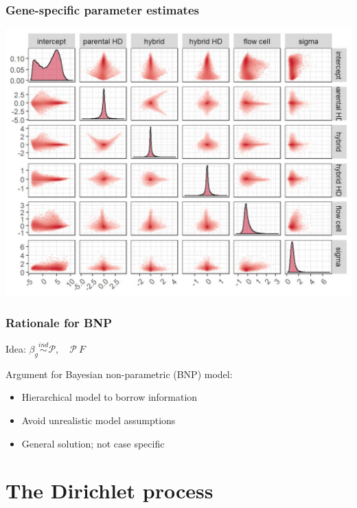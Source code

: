 \documentclass{beamer}
\newcommand{\ind}{\stackrel{ind}{\sim}}
\begin{document}
\begin{frame}%
  \frametitle{Gene-specific parameter estimates}
  {\centering
    \includegraphics[width=.8\textwidth]{pairs1}\\
  }
\end{frame}
  
\begin{frame}%
  \frametitle{Rationale for BNP}
  Idea: $\beta_g \ind \mathcal{P},\quad \mathcal{P} ~ F$
  
  Argument for Bayesian non-parametric (BNP) model:
  \begin{itemize}
    \item Hierarchical model to borrow information
    \item Avoid unrealistic model assumptions
    \item General solution; not case specific
  \end{itemize}
\end{frame}

\section[DP intro]{The Dirichlet process}
\end{document}
